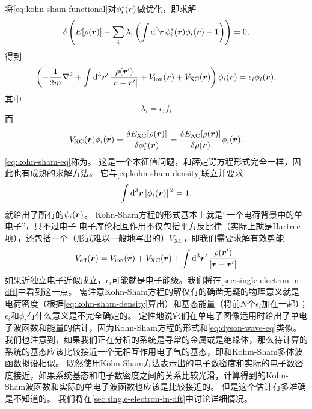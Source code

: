 将\eqref{eq:kohn-sham-functional}对$\phi_i^*(\vb*{r})$做优化，即求解
\begin{equation}
    \var \left( E[\rho(\vb*{r})] - \sum_i \lambda_i \left( \int \dd[3]{\vb*{r}} \phi_i^*(\vb*{r}) \phi_i(\vb*{r}) - 1 \right) \right) = 0,
    \label{eq:dft-variation-principle-shem}
\end{equation}
得到
\begin{equation}
    \left( - \frac{1}{2 m} \laplacian + \int \dd[3]{\vb*{r}'} \frac{\rho(\vb*{r}')}{\abs{\vb*{r} - \vb*{r}'}} + V_\text{ion}(\vb*{r}) + V_\text{XC}(\vb*{r}) \right) \phi_i(\vb*{r}) = \epsilon_i \phi_i(\vb*{r}),
    \label{eq:kohn-sham-eq}
\end{equation}
其中
\begin{equation}
    \lambda_i = \epsilon_i f_i
\end{equation}
而
\begin{equation}
    V_\text{XC}(\vb*{r}) \phi_i(\vb*{r}) = \fdv{E_\text{XC}[\rho(\vb*{r})]}{\phi^*_i(\vb*{r})} = \fdv{E_\text{XC}[\rho(\vb*{r})]}{\rho(\vb*{r})} \phi_i(\vb*{r}).
\end{equation}
\eqref{eq:kohn-sham-eq}称为。
这是一个本征值问题，和薛定谔方程形式完全一样，因此也有成熟的求解方法。
它与\eqref{eq:kohn-sham-density}联立并要求
\begin{equation}
    \int \dd[3]{\vb*{r}} \abs*{\phi_i(\vb*{r})}^2 = 1,
\end{equation}
就给出了所有的$\psi_i(\vb*{r})$。
Kohn-Sham方程的形式基本上就是“一个电荷背景中的单电子”，只不过电子-电子库伦相互作用不仅包括平方反比律（实际上就是Hartree项），还包括一个（形式难以一般地写出的）$V_\text{XC}$，即我们需要求解有效势能
\begin{equation}
    V_\text{eff}(\vb*{r}) = V_\text{ion}(\vb*{r}) + V_\text{XC}(\vb*{r}) + \int \dd[3]{\vb*{r}'} \frac{\rho(\vb*{r}')}{\abs{\vb*{r} - \vb*{r}'}}
\end{equation}
如果近独立电子近似成立，$\epsilon_i$可能就是电子能级。我们将在\autoref{sec:single-electron-in-dft}中看到这一点。
需注意Kohn-Sham方程的解仅有的确凿无疑的物理意义就是电荷密度（根据\eqref{eq:kohn-sham-density}算出）和基态能量（将前$N$个$\epsilon_i$加在一起）；$\epsilon_i$和$\phi_i$有什么意义是不完全确定的。
定性地说它们在单电子图像适用时给出了单电子波函数和能量的估计，因为Kohn-Sham方程的形式和\eqref{eq:dyson-wave-eq}类似。
我们也注意到，如果我们正在分析的系统是寻常的金属或是绝缘体，那么待计算的系统的基态应该比较接近一个无相互作用电子气的基态，即和Kohm-Sham多体波函数拟设相似。
既然使用Kohn-Sham方法表示出的电子数密度和实际的电子数密度接近，如果系统基态和电子数密度之间的关系比较光滑，计算得到的Kohn-Sham波函数和实际的单电子波函数也应该是比较接近的。
但是这个估计有多准确是不知道的。
我们将在\autoref{sec:single-electron-in-dft}中讨论详细情况。

